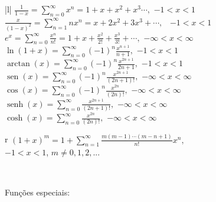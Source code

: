 \documentclass[10pt,a4paper]{article}%
\renewcommand{\sin}{\operatorname{sen}}
\renewcommand{\sinh}{\operatorname{senh}}
\begin{document}
{\begin{minipage}[r]{7.8cm}
{{\tabulinesep=1.2mm
\begin{tabu}{|l|} 
\hline
 $\displaystyle \frac{1}{1-x}=\sum_{n=0}^\infty x^n=1+x+x^2+x^3\cdots,$ \quad$\displaystyle -1<x<1$ \\ 
\hline
 $\displaystyle \frac{x}{(1-x)^2}=\sum_{n=1}^\infty n x^n=x+2x^2+3x^3+\cdots,$ \ $\displaystyle -1<x<1$ \\ 
\hline
 $\displaystyle e^x=\sum_{n=0}^\infty \frac{x^n}{n!}=1+x+\frac{x^2}{2!}+\frac{x^3}{3!}+\cdots,$  \quad$\displaystyle -\infty<x<\infty$ \\ 
\hline
 $\displaystyle \ln(1+x)=\sum_{n=0}^\infty(-1)^n \frac{x^{n+1}}{n+1},$  \quad$\displaystyle -1<x<1$ \\ 
\hline
 $\displaystyle \arctan(x)=\sum_{n=0}^\infty(-1)^n \frac{x^{2n+1}}{2n+1},$  \quad$\displaystyle -1<x<1$ \\ 
\hline
 $\displaystyle \sin(x)=\sum_{n=0}^\infty(-1)^n \frac{x^{2n+1}}{(2n+1)!},$  \quad$\displaystyle -\infty<x<\infty$ \\ 
\hline
 $\displaystyle \cos(x)=\sum_{n=0}^\infty(-1)^n \frac{x^{2n}}{(2n)!},$  \quad$\displaystyle -\infty<x<\infty$ \\ 
\hline
 $\displaystyle \sinh(x)=\sum_{n=0}^\infty \frac{x^{2n+1}}{(2n+1)!},$  \quad$\displaystyle -\infty<x<\infty$ \\ 
\hline
 $\displaystyle \cosh(x)=\sum_{n=0}^\infty \frac{x^{2n}}{(2n)!},$  \quad$\displaystyle -\infty<x<\infty$ \\ 
\hline
\begin{tabu}{r} $\displaystyle (1+x)^m=1+\sum_{n=1}^\infty \frac{m(m-1)\cdots (m-n+1)}{n!}x^n,$ \\$\displaystyle -1<x<1$, $m\neq 0,1,2,...$ \end{tabu}\\ 
\hline
\end{tabu}}


}
\end{minipage}

\vspace{15pt}

\noindent\begin{minipage}[l]{10.2cm}
{\footnotesize 
Funções especiais:

}
\end{minipage}}
\end{document}
